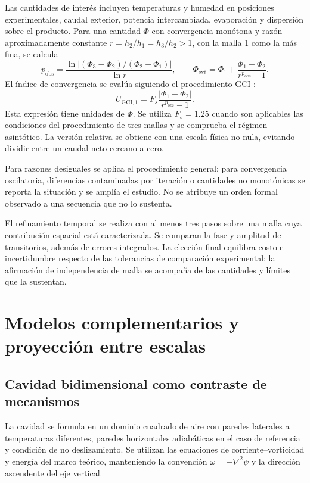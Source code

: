 Las cantidades de interés incluyen temperaturas y humedad en posiciones experimentales, caudal exterior, potencia intercambiada, evaporación y dispersión sobre el producto. Para una cantidad $\Phi$ con convergencia monótona y razón aproximadamente constante $r=h_2/h_1=h_3/h_2>1$, con la malla 1 como la más fina, se calcula
\begin{equation}
p_{\mathrm{obs}}=
\frac{\ln|(\Phi_3-\Phi_2)/(\Phi_2-\Phi_1)|}{\ln r},
\qquad
\Phi_{\mathrm{ext}}=\Phi_1+
\frac{\Phi_1-\Phi_2}{r^{p_{\mathrm{obs}}}-1}.
\label{met:richardson}
\end{equation}
El índice de convergencia se evalúa siguiendo el procedimiento GCI \cite{celik2008}:
\begin{equation}
U_{\mathrm{GCI},1}=
F_s\frac{|\Phi_1-\Phi_2|}{r^{p_{\mathrm{obs}}}-1}.
\label{met:gci}
\end{equation}
Esta expresión tiene unidades de $\Phi$. Se utiliza $F_s=1.25$ cuando son aplicables las condiciones del procedimiento de tres mallas y se comprueba el régimen asintótico. La versión relativa se obtiene con una escala física no nula, evitando dividir entre un caudal neto cercano a cero.

Para razones desiguales se aplica el procedimiento general; para convergencia oscilatoria, diferencias contaminadas por iteración o cantidades no monotónicas se reporta la situación y se amplía el estudio. No se atribuye un orden formal observado a una secuencia que no lo sustenta.

El refinamiento temporal se realiza con al menos tres pasos sobre una malla cuya contribución espacial está caracterizada. Se comparan la fase y amplitud de transitorios, además de errores integrados. La elección final equilibra costo e incertidumbre respecto de las tolerancias de comparación experimental; la afirmación de independencia de malla se acompaña de las cantidades y límites que la sustentan.

\section{Modelos complementarios y proyección entre escalas}
\label{met:modelos_complementarios}

\subsection{Cavidad bidimensional como contraste de mecanismos}
\label{met:cavidad}

La cavidad se formula en un dominio cuadrado de aire con paredes laterales a temperaturas diferentes, paredes horizontales adiabáticas en el caso de referencia y condición de no deslizamiento. Se utilizan las ecuaciones de corriente--vorticidad y energía del marco teórico, manteniendo la convención $\omega=-\nabla^2\psi$ y la dirección ascendente del eje vertical.

